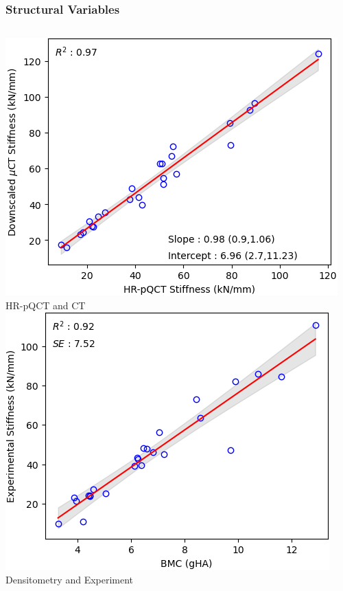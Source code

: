\documentclass[xcolor=table,11pt]{beamer}
\begin{document}
	\begin{frame}
		\frametitle{Structural Variables}
		\begin{columns}
			\centering
			\includegraphics[width=1.0\linewidth, trim=4 0 4 0]{Figures/HRpQCTvsMicroCT_Stiffness}\\
			HR-pQCT and \textmu CT
			\centering
			\includegraphics[width=1.0\linewidth]{Figures/BMCvsStiffness}\\
			Densitometry and Experiment
			\centering

\end{columns}
\end{frame}
\end{document}
